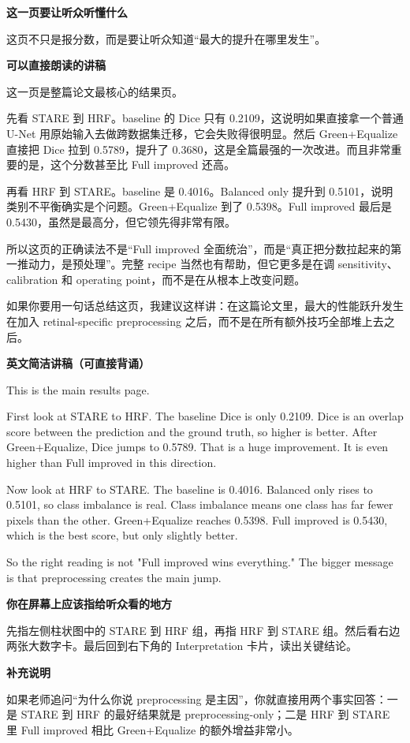\documentclass[12pt,a4paper]{ctexart}
\newcommand{\EnglishScriptHeading}{\textbf{\color{AccentGreen}英文简洁讲稿（可直接背诵）}}
\begin{document}
\textbf{这一页要让听众听懂什么}

这页不只是报分数，而是要让听众知道“最大的提升在哪里发生”。

\textbf{可以直接朗读的讲稿}

这一页是整篇论文最核心的结果页。

先看 STARE 到 HRF。baseline 的 Dice 只有 0.2109，这说明如果直接拿一个普通 U-Net 用原始输入去做跨数据集迁移，它会失败得很明显。然后 Green+Equalize 直接把 Dice 拉到 0.5789，提升了 0.3680，这是全篇最强的一次改进。而且非常重要的是，这个分数甚至比 Full improved 还高。

再看 HRF 到 STARE。baseline 是 0.4016。Balanced only 提升到 0.5101，说明类别不平衡确实是个问题。Green+Equalize 到了 0.5398。Full improved 最后是 0.5430，虽然是最高分，但它领先得非常有限。

所以这页的正确读法不是“Full improved 全面统治”，而是“真正把分数拉起来的第一推动力，是预处理”。完整 recipe 当然也有帮助，但它更多是在调 sensitivity、calibration 和 operating point，而不是在从根本上改变问题。

如果你要用一句话总结这页，我建议这样讲：在这篇论文里，最大的性能跃升发生在加入 retinal-specific preprocessing 之后，而不是在所有额外技巧全部堆上去之后。

\EnglishScriptHeading

This is the main results page.

First look at STARE to HRF. The baseline Dice is only 0.2109. Dice is an overlap score between the prediction and the ground truth, so higher is better. After Green+Equalize, Dice jumps to 0.5789. That is a huge improvement. It is even higher than Full improved in this direction.

Now look at HRF to STARE. The baseline is 0.4016. Balanced only rises to 0.5101, so class imbalance is real. Class imbalance means one class has far fewer pixels than the other. Green+Equalize reaches 0.5398. Full improved is 0.5430, which is the best score, but only slightly better.

So the right reading is not "Full improved wins everything." The bigger message is that preprocessing creates the main jump.

\textbf{你在屏幕上应该指给听众看的地方}

先指左侧柱状图中的 STARE 到 HRF 组，再指 HRF 到 STARE 组。然后看右边两张大数字卡。最后回到右下角的 Interpretation 卡片，读出关键结论。

\textbf{补充说明}

如果老师追问“为什么你说 preprocessing 是主因”，你就直接用两个事实回答：一是 STARE 到 HRF 的最好结果就是 preprocessing-only；二是 HRF 到 STARE 里 Full improved 相比 Green+Equalize 的额外增益非常小。
\end{document}
